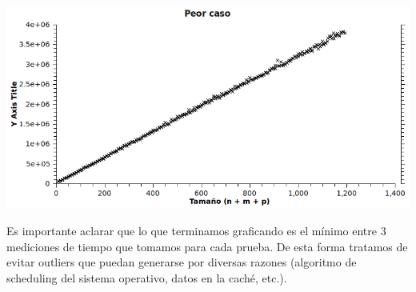 \begin{center}
\includegraphics[scale=0.75]{img/ej3/peor_caso.png} 
\end{center}

Es importante aclarar que lo que terminamos graficando es el mínimo entre 3 mediciones de tiempo que tomamos para cada prueba. De esta forma tratamos de evitar outliers que puedan generarse por diversas razones (algoritmo de scheduling del sistema operativo, datos en la caché, etc.). \\
